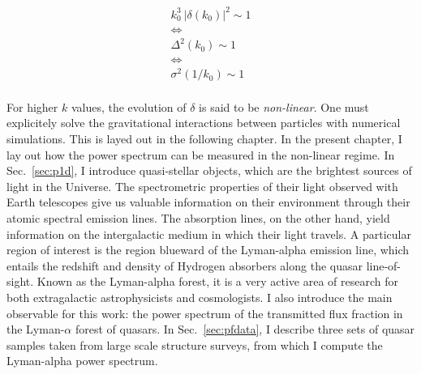 \begin{equation*}
\begin{array}{c}
k_0^3 ~\vert \delta(k_0) \vert^2 \sim 1 \\
\Leftrightarrow \\
\Delta^2 (k_0) \sim 1 \\
\Leftrightarrow \\
\sigma^2 (1/k_0) \sim 1
\end{array}
\end{equation*} \\ For higher $k$ values, the evolution of $\delta$ is said to be \emph{non-linear}. One must explicitely solve the gravitational interactions between particles with numerical simulations. This is layed out in the following chapter. In the present chapter, I lay out how the power spectrum can be measured in the non-linear regime. In Sec.~\ref{sec:p1d}, I introduce quasi-stellar objects, which are the brightest sources of light in the Universe. The spectrometric properties of their light observed with Earth telescopes give us valuable information on their environment through their atomic spectral emission lines. The absorption lines, on the other hand, yield information on the intergalactic medium in which their light travels. A particular region of interest is the region blueward of the Lyman-alpha emission line, which entails the redshift and density of Hydrogen absorbers along the quasar line-of-sight. Known as the Lyman-alpha forest, it is a very active area of research for both extragalactic astrophysicists and cosmologists. I also introduce the main observable for this work: the power spectrum of the transmitted flux fraction in the Lyman-$\alpha$ forest of quasars. In Sec.~\ref{sec:pfdata}, I describe three sets of quasar samples taken from large scale structure surveys, from which I compute the Lyman-alpha power spectrum. 
